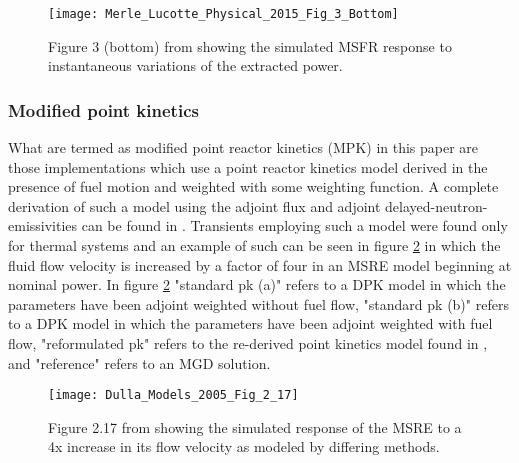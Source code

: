 \documentclass[review]{elsarticle}
\begin{document}
\begin{figure}[h]
   \centering
   \texttt{[image: Merle\_Lucotte\_Physical\_2015\_Fig\_3\_Bottom]}
   \caption{Figure 3 (bottom) from \cite{merle-lucotte_physical_2015} showing the simulated MSFR
   response to instantaneous variations of the extracted power.} 
   \label{fig:lucotte_ipk}
\end{figure}

\subsubsection{Modified point kinetics} \label{sssec:mpk}
What are termed as
modified point reactor kinetics (MPK) in this paper are those implementations
which use a point reactor kinetics model derived in the presence of fuel motion
and weighted with some weighting function. A complete derivation of such a
model using the adjoint flux and adjoint delayed-neutron-emissivities can be
found in \cite{dulla_models_2005}. Transients employing such a model were found
only for thermal systems and an example of such can be seen in figure 
\ref{fig:dulla_4x_flow} in which the fluid flow velocity is increased by a factor
of four in an MSRE model beginning at nominal power.
In figure \ref{fig:dulla_4x_flow} "standard pk (a)" refers
to a DPK model in which the parameters have been adjoint weighted without fuel
flow, "standard pk (b)" refers to a DPK model in which the parameters have
been adjoint weighted with fuel flow, "reformulated pk" refers to the re-derived
point kinetics model found in \cite{dulla_models_2005}, and "reference" refers
to an MGD solution.

\begin{figure}[h]
   \centering
   \texttt{[image: Dulla\_Models\_2005\_Fig\_2\_17]}
   \caption{Figure 2.17 from \cite{dulla_models_2005} showing the simulated response of the MSRE
   to a 4x increase in its flow velocity as modeled by differing methods.} 
   \label{fig:dulla_4x_flow}
\end{figure}
\end{document}
